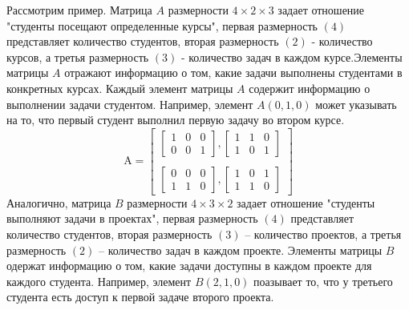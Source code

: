 \documentclass{article}
\begin{document}
Рассмотрим пример. Матрица $A$ размерности $4 \times 2 \times 3$ задает отношение "студенты посещают определенные курсы", первая размерность $(4)$ представляет количество студентов, вторая размерность $(2)$ - количество курсов, а третья размерность $(3)$ - количество задач в каждом курсе.Элементы матрицы $A$ отражают информацию о том, какие задачи выполнены студентами в конкретных курсах. Каждый элемент матрицы $A$ содержит информацию о выполнении задачи студентом. Например, элемент $A(0, 1, 0)$ может указывать на то, что первый студент выполнил первую задачу во втором курсе.
\[
\text{A} = \begin{bmatrix}
    \begin{bmatrix}
      1 & 0 & 0 \\
      0 & 0 & 1 
      \end{bmatrix},
     
    \begin{bmatrix}
      1 & 1 & 0 \\
      1 & 0 & 1 
    \end{bmatrix} \\\\
    \begin{bmatrix}
      0 & 0 & 0 \\
      1 & 1 & 0 
    \end{bmatrix},
     
    \begin{bmatrix}
      1 & 0 & 1 \\
      1 & 1 & 0 
    \end{bmatrix}
\end{bmatrix}
\] 
Аналогично, матрица $B$ размерности $4 \times 3 \times 2$ задает отношение "студенты выполняют задачи в проектах", первая размерность $(4)$ представляет количество студентов, вторая размерность $(3)$ -- количество проектов, а третья размерность $(2)$ -- количество задач в каждом проекте. Элементы матрицы $B$ одержат информацию о том, какие задачи доступны в каждом проекте для каждого студента. Например, элемент $B(2, 1, 0)$ поазывает то, что у третьего студента есть доступ к первой задаче второго проекта.
\end{document}
